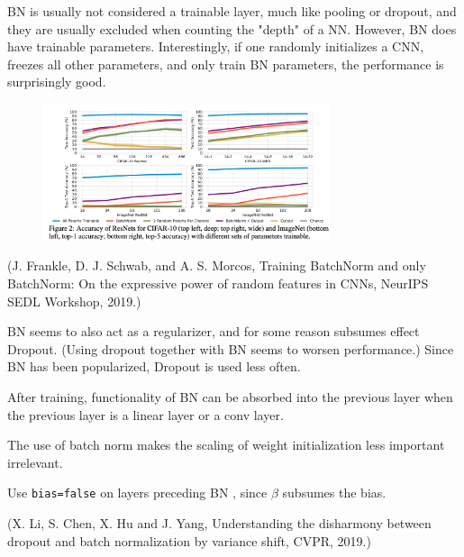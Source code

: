 \begin{concept}
    BN is usually not considered a trainable layer, much like pooling or dropout, and they are usually excluded when counting the "depth" of a NN. However, BN does have trainable parameters. Interestingly, if one randomly initializes a CNN, freezes all other parameters, and only train BN parameters, the performance is surprisingly good.

    \begin{figure}[H]
        \centering
        \includegraphics[width=0.75\textwidth]{.././assets/6.14.png}
    \end{figure}

    (J. Frankle, D. J. Schwab, and A. S. Morcos, Training BatchNorm and only BatchNorm: On the expressive power of random features in CNNs, NeurIPS SEDL Workshop, 2019.)
\end{concept}

\begin{concept}[6.51][Discussion of BN]
    BN seems to also act as a regularizer, and for some reason subsumes effect Dropout. (Using dropout together with BN seems to worsen performance.) Since BN has been popularized, Dropout is used less often.

    After training, functionality of BN can be absorbed into the previous layer when the previous layer is a linear layer or a conv layer.

    The use of batch norm makes the scaling of weight initialization less important irrelevant.

    Use \verb|bias=false| on layers preceding BN , since $\beta$ subsumes the bias.

    (X. Li, S. Chen, X. Hu and J. Yang, Understanding the disharmony between dropout and batch normalization by variance shift, CVPR, 2019.)
\end{concept}
